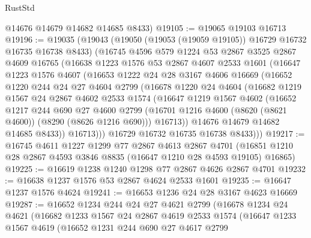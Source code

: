 \begin{lexlean}{RustStd}
\begin{coremodule}
      @14676
      @14679
      @14682
      @14685
      @8433)
@19105 := @19065 @19103 @16713
@19196 := @19035
    (@19043
      (@19050 (@19053 (@19059 @19105)) @16729 @16732 @16735 @16738 @8433)
      (@16745
        @4596
        @579
        @1224
        @53
        @2867
        @3525
        @2867
        @4609
        @16765
        (@16638
          @1223
          @1576
          @53
          @2867
          @4607
          @2533
          @1601
          (@16647
            @1223
            @1576
            @4607
            (@16653
              @1222
              @24
              @28
              @3167
              @4606
              @16669
              (@16652
                @1220
                @244
                @24
                @27
                @4604
                @2799
                (@16678
                  @1220
                  @24
                  @4604
                  (@16682
                    @1219
                    @1567
                    @24
                    @2867
                    @4602
                    @2533
                    @1574
                    (@16647
                      @1219
                      @1567
                      @4602
                      (@16652
                        @1217
                        @244
                        @690
                        @27
                        @4600
                        @2799
                        (@16701 @1216 @4600 (@8620 (@8621 @4600)) (@8290 (@8626 @1216 @690)))
                        @16713))
                    @14676
                    @14679
                    @14682
                    @14685
                    @8433))
                @16713)))
          @16729
          @16732
          @16735
          @16738
          @8433)))
@19217 := @16745
    @4611
    @1227
    @1299
    @77
    @2867
    @4613
    @2867
    @4701
    (@16851 @1210 @28 @2867 @4593 @3846 @8835 (@16647 @1210 @28 @4593 @19105) @16865)
@19225 := @16619 @1238 @1240 @1298 @77 @2867 @4626 @2867 @4701
@19232 := @16638 @1237 @1576 @53 @2867 @4624 @2533 @1601
@19235 := @16647 @1237 @1576 @4624
@19241 := @16653 @1236 @24 @28 @3167 @4623 @16669
@19287 := @16652
    @1234
    @244
    @24
    @27
    @4621
    @2799
    (@16678
      @1234
      @24
      @4621
      (@16682
        @1233
        @1567
        @24
        @2867
        @4619
        @2533
        @1574
        (@16647
          @1233
          @1567
          @4619
          (@16652
            @1231
            @244
            @690
            @27
            @4617
            @2799

\end{coremodule}
\end{lexlean}
